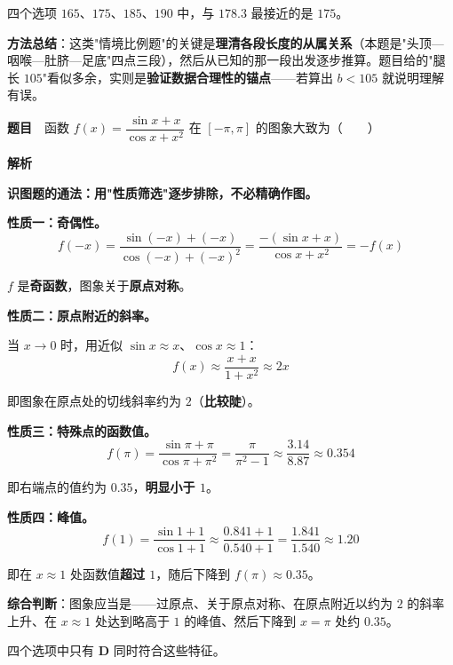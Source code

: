四个选项 $165$、$175$、$185$、$190$ 中，与 $178.3$ 最接近的是 $175$。


\begin{gktip}
\textbf{方法总结}：这类"情境比例题"的关键是\textbf{理清各段长度的从属关系}（本题是"头顶—咽喉—肚脐—足底"四点三段），然后从已知的那一段出发逐步推算。题目给的"腿长 $105$"看似多余，实则是\textbf{验证数据合理性的锚点}——若算出 $b<105$ 就说明理解有误。
\end{gktip}

\par\medskip


\textbf{题目}　函数 $f(x)=\dfrac{\sin x+x}{\cos x+x^{2}}$ 在 $[-\pi,\pi]$ 的图象大致为（　　）

\begin{center}\end{center}

\textbf{解析}

\textbf{识图题的通法：用"性质筛选"逐步排除，不必精确作图。}

\textbf{性质一：奇偶性。}
\[f(-x)=\frac{\sin(-x)+(-x)}{\cos(-x)+(-x)^{2}}=\frac{-(\sin x+x)}{\cos x+x^{2}}=-f(x)\]

$f$ 是\textbf{奇函数}，图象关于\textbf{原点对称}。

\textbf{性质二：原点附近的斜率。}

当 $x\to0$ 时，用近似 $\sin x\approx x$、$\cos x\approx1$：
\[f(x)\approx\frac{x+x}{1+x^{2}}\approx2x\]

即图象在原点处的切线斜率约为 $2$（\textbf{比较陡}）。

\textbf{性质三：特殊点的函数值。}
\[f(\pi)=\frac{\sin\pi+\pi}{\cos\pi+\pi^{2}}=\frac{\pi}{\pi^{2}-1}\approx\frac{3.14}{8.87}\approx0.354\]

即右端点的值约为 $0.35$，\textbf{明显小于 $1$}。

\textbf{性质四：峰值。}
\[f(1)=\frac{\sin1+1}{\cos1+1}\approx\frac{0.841+1}{0.540+1}=\frac{1.841}{1.540}\approx1.20\]

即在 $x\approx1$ 处函数值\textbf{超过 $1$}，随后下降到 $f(\pi)\approx0.35$。

\textbf{综合判断}：图象应当是——过原点、关于原点对称、在原点附近以约为 $2$ 的斜率上升、在 $x\approx1$ 处达到略高于 $1$ 的峰值、然后下降到 $x=\pi$ 处约 $0.35$。

四个选项中只有 \textbf{D} 同时符合这些特征。


